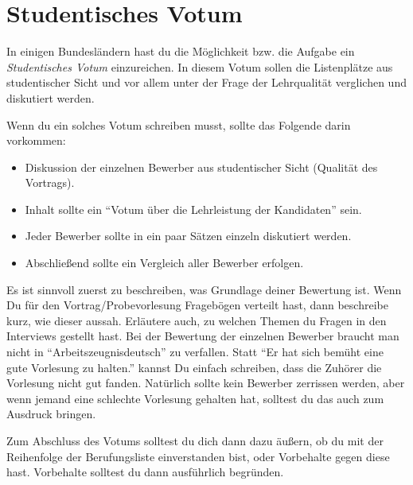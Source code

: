 \section{Studentisches Votum}
In einigen Bundesländern hast du die Möglichkeit bzw. die Aufgabe ein \emph{Studentisches Votum} einzureichen. In diesem Votum sollen die Listenplätze aus studentischer Sicht und vor allem unter der Frage der Lehrqualität verglichen und diskutiert werden.

Wenn du ein solches Votum schreiben musst, sollte das Folgende darin vorkommen:
\begin{itemize}
    \item Diskussion der einzelnen Bewerber aus studentischer Sicht (Qualität des Vortrags).
    \item Inhalt sollte ein "`Votum über die Lehrleistung der Kandidaten"' sein.
    \item Jeder Bewerber sollte in ein paar Sätzen einzeln diskutiert werden.
    \item Abschließend sollte ein Vergleich aller Bewerber erfolgen.
\end{itemize}

Es ist sinnvoll zuerst zu beschreiben, was Grundlage deiner Bewertung ist. Wenn Du für den Vortrag/Probevorlesung Fragebögen verteilt hast, dann beschreibe kurz, wie dieser aussah. Erläutere auch, zu welchen Themen du Fragen in den Interviews gestellt hast. Bei der Bewertung der einzelnen Bewerber braucht man nicht in "`Arbeitszeugnisdeutsch"' zu verfallen. Statt "`Er hat sich bemüht eine gute Vorlesung zu halten."' kannst Du einfach schreiben, dass die Zuhörer die Vorlesung nicht gut fanden. Natürlich sollte kein Bewerber zerrissen werden, aber wenn jemand eine schlechte Vorlesung gehalten hat, solltest du das auch zum Ausdruck bringen.

Zum Abschluss des Votums solltest du dich dann dazu äußern, ob du mit der Reihenfolge der Berufungsliste
einverstanden bist, oder Vorbehalte gegen diese hast. Vorbehalte solltest du dann ausführlich begründen.

